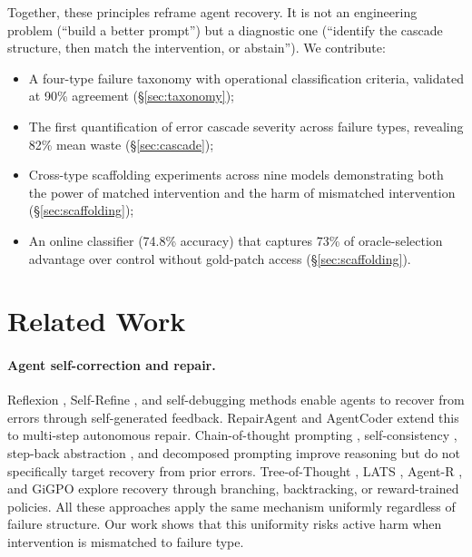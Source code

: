 \documentclass[11pt]{article}
\begin{document}
Together, these principles reframe agent recovery.
It is not an engineering problem (``build a better prompt'') but a diagnostic one (``identify the cascade structure, then match the intervention, or abstain'').
We contribute:
\begin{itemize}
\setlength{\itemsep}{0pt}
\item A four-type failure taxonomy with operational classification criteria, validated at 90\% agreement (\S\ref{sec:taxonomy});
\item The first quantification of error cascade severity across failure types, revealing 82\% mean waste (\S\ref{sec:cascade});
\item Cross-type scaffolding experiments across nine models demonstrating both the power of matched intervention and the harm of mismatched intervention (\S\ref{sec:scaffolding});
\item An online classifier (74.8\% accuracy) that captures 73\% of oracle-selection advantage over control without gold-patch access (\S\ref{sec:scaffolding}).
\end{itemize}


\section{Related Work}

\paragraph{Agent self-correction and repair.}
Reflexion \citep{shinn2023reflexion}, Self-Refine \citep{madaan2023selfrefine}, and self-debugging methods \citep{chen2023teaching, chen2025revisitselfdebugging, olausson2024repair} enable agents to recover from errors through self-generated feedback.
RepairAgent \citep{bouzenia2025repairagent} and AgentCoder \citep{huang2024agentcoder} extend this to multi-step autonomous repair.
Chain-of-thought prompting \citep{wei2022chain}, self-consistency \citep{wang2023selfconsistency}, step-back abstraction \citep{zheng2024stepback}, and decomposed prompting \citep{khot2023decomposed} improve reasoning but do not specifically target recovery from prior errors.
Tree-of-Thought \citep{yao2023tot}, LATS \citep{zhou2024lats}, Agent-R \citep{yuan2025agentr}, and GiGPO \citep{feng2025gigpo} explore recovery through branching, backtracking, or reward-trained policies.
All these approaches apply the same mechanism uniformly regardless of failure structure.
Our work shows that this uniformity risks active harm when intervention is mismatched to failure type.
\end{document}
